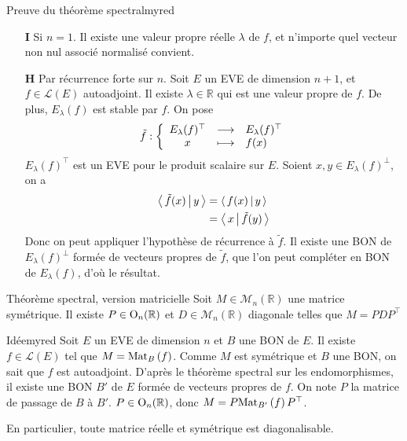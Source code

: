     \begin{demo}{Preuve du théorème spectral}{myred}
        \begin{itemize}
            \item[\textbf{I}] Si $n = 1$. Il existe une valeur propre réelle $\lambda$ de $f$, et n’importe quel vecteur non nul associé normalisé convient.
            \item[\textbf{H}] Par récurrence forte sur $n$. Soit $E$ un EVE de dimension $n+1$, et $f \in \mathcal{L}(E)$ autoadjoint. Il existe $\lambda \in \mathbb{R}$ qui est une valeur propre de $f$. De plus, $E_{\lambda}(f)$ est stable par $f$. On pose 
            \[ \fonction{\tilde{f}}{E_{\lambda}(f)^{\top}}{E_{\lambda}(f)^{\top}}{x}{f(x)} \]   
            $E_{\lambda}(f)^{\top}$ est un EVE pour le produit scalaire sur $E$. Soient $x,y \in E_{\lambda}(f)^{\perp}$, on a 
            \begin{align*}
                \left<\,\tilde{f}(x)\,\middle|\,y\,\right> 
                &= \left<\,f(x)\,\middle|\,y\,\right> \\
                &= \left<\,x\,\middle|\,\tilde{f}(y)\,\right>
            \end{align*}
            Donc on peut appliquer l’hypothèse de récurrence à $\tilde{f}$. Il existe une BON de $E_{\lambda}(f)^{\perp}$ formée de vecteurs propres de $\tilde{f}$, que l’on peut compléter en BON de $E_{\lambda}(f)$, d’où le résultat.
        \end{itemize}
    \end{demo}

    \begin{theo}{Théorème spectral, version matricielle}{}
        Soit $M \in \mathcal{M}_n(\mathbb{R})$ une matrice symétrique. Il existe $P \in \operatorname{O}_n(\mathbb{R})$ et $D \in \mathcal{M}_n(\mathbb{R})$ diagonale telles que $M = P D P^{\top}$
    \end{theo}

    \begin{demo}{Idée}{myred}
        Soit $E$ un EVE de dimension $n$ et $B$ une BON de $E$. Il existe $f \in \mathcal{L}(E)$ tel que $M = \text{Mat}_{B}\left(f\right)$. Comme $M$ est symétrique et $B$ une BON, on sait que $f$ est autoadjoint. D’après le théorème spectral sur les endomorphismes, il existe une BON $B'$ de $E$ formée de vecteurs propres de $f$. On note $P$ la matrice de passage de $B$ à $B'$. $P \in \operatorname{O}_n(\mathbb{R})$, donc $M = P \text{Mat}_{B'}\left(f\right) P^{\top}$.
    \end{demo}

    En particulier, toute matrice réelle et symétrique est diagonalisable.

